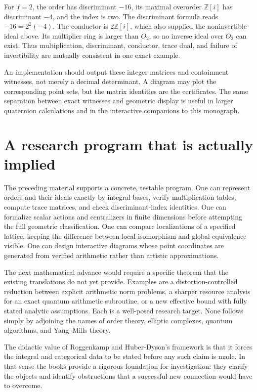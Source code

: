For $f=2$, the order has discriminant $-16$, its maximal
overorder $\mathbb Z[i]$ has discriminant $-4$, and the
index is two. The discriminant formula reads
$-16=2^2(-4)$. The conductor is $2\mathbb Z[i]$, which
also supplied the noninvertible ideal above. Its multiplier
ring is larger than $O_2$, so no inverse ideal over $O_2$
can exist. Thus multiplication, discriminant, conductor,
trace dual, and failure of invertibility are mutually
consistent in one exact example.

An implementation should output these integer matrices and
containment witnesses, not merely a decimal determinant.
A diagram may plot the corresponding point sets, but the
matrix identities are the certificates. The same separation
between exact witnesses and geometric display is useful in
larger quaternion calculations and in the interactive
companions to this monograph.

\section{A research program that is actually implied}

The preceding material supports a concrete, testable program.
One can represent orders and their ideals exactly by integral
bases, verify multiplication tables, compute trace matrices, and
check discriminant-index identities. One can formalize scalar
actions and centralizers in finite dimensions before attempting
the full geometric classification. One can compare localizations
of a specified lattice, keeping the difference between local
isomorphism and global equivalence visible. One can design
interactive diagrams whose point coordinates are generated from
verified arithmetic rather than artistic approximations.

The next mathematical advance would require a specific theorem
that the existing translations do not yet provide. Examples are
a distortion-controlled reduction between explicit arithmetic
norm problems, a sharper resource analysis for an exact quantum
arithmetic subroutine, or a new effective bound with fully stated
analytic assumptions. Each is a well-posed research target. None
follows simply by adjoining the names of order theory, elliptic
complexes, quantum algorithms, and Yang--Mills theory.

The didactic value of Roggenkamp and Huber-Dyson's framework is
that it forces the integral and categorical data to be stated
before any such claim is made. In that sense the books provide a
rigorous foundation for investigation: they clarify the objects
and identify obstructions that a successful new connection would
have to overcome.

